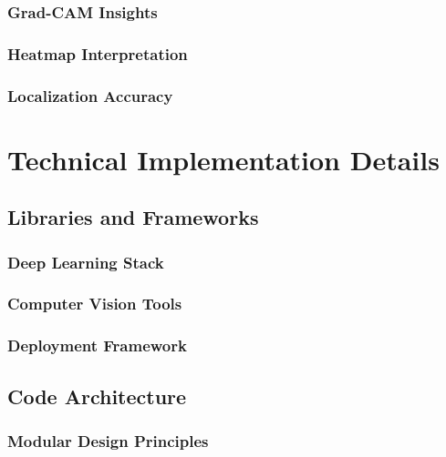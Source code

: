 \documentclass[12pt,a4paper]{report}
\begin{document}
\subsubsection{Grad-CAM Insights}

\subsubsection{Heatmap Interpretation}

\subsubsection{Localization Accuracy}

\section{Technical Implementation Details}

\subsection{Libraries and Frameworks}

\subsubsection{Deep Learning Stack}

\subsubsection{Computer Vision Tools}

\subsubsection{Deployment Framework}

\subsection{Code Architecture}

\subsubsection{Modular Design Principles}
\end{document}
